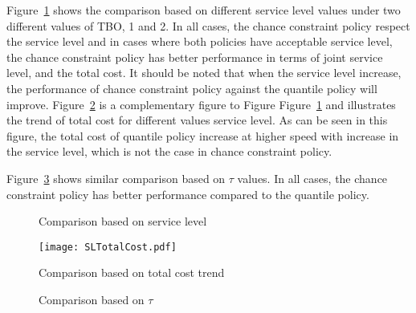 \documentclass[10pt]{article}
\begin{document}
Figure~\ref{fig:SLComp} shows the comparison based on different service level values under two different values of TBO, 1 and 2. In all cases, the chance constraint policy respect the service level and in cases where both policies have acceptable service level, the chance constraint policy has better performance in terms of joint service level, and the total cost. It should be noted that when the service level increase, the performance of chance constraint policy against the quantile policy will improve. Figure~\ref{fig:SLTotalCost} is a complementary figure to Figure Figure~\ref{fig:SLComp} and illustrates the trend of total cost for different values service level. As can be seen in this figure, the total cost of quantile policy increase at higher speed with increase in the service level, which is not the case in chance constraint policy.

Figure~\ref{fig:TIComp} shows similar comparison based on $\tau$ values. In all cases, the chance constraint policy has better performance compared to the quantile policy.

\begin{figure}%
    \centering
    \caption{Comparison based on service level}%
    \label{fig:SLComp}%
\end{figure}

\begin{figure}[!h]
\begin{center}
\texttt{[image: SLTotalCost.pdf]}
\caption{Comparison based on total cost trend} 
\label{fig:SLTotalCost}
\end{center}
\end{figure}


\begin{figure}%
    \centering
    \caption{Comparison based on $\tau$}%
    \label{fig:TIComp}%
\end{figure}
\end{document}
